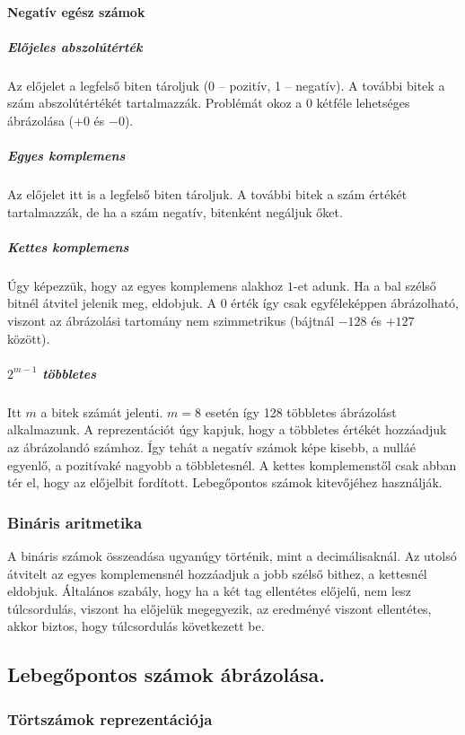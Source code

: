 \documentclass[a4paper]{article}
\begin{document}
\paragraph{Negatív egész számok}

\subparagraph{Előjeles abszolútérték} Az előjelet a legfelső biten tároljuk (0 -- pozitív, 1 -- negatív). A további bitek a szám abszolútértékét tartalmazzák. Problémát okoz a 0 kétféle lehetséges ábrázolása ($+0$ és $-0$).

\subparagraph{Egyes komplemens} Az előjelet itt is a legfelső biten tároljuk. A további bitek a szám értékét tartalmazzák, de ha a szám negatív, bitenként negáljuk őket.

\subparagraph{Kettes komplemens} Úgy képezzük, hogy az egyes komplemens alakhoz $1$-et adunk. Ha a bal szélső bitnél átvitel jelenik meg, eldobjuk. A $0$ érték így csak egyféleképpen ábrázolható, viszont az ábrázolási tartomány nem szimmetrikus (bájtnál $-128$ és $+127$ között).

\subparagraph{$2^{m-1}$ többletes} Itt $m$ a bitek számát jelenti. $m=8$ esetén így 128 többletes ábrázolást alkalmazunk. A reprezentációt úgy kapjuk, hogy a többletes értékét hozzáadjuk az ábrázolandó számhoz. Így tehát a negatív számok képe kisebb, a nulláé egyenlő, a pozitívaké nagyobb a többletesnél. A kettes komplemenstől csak abban tér el, hogy az előjelbit fordított. Lebegőpontos számok kitevőjéhez használják.

\subsubsection{Bináris aritmetika}

A bináris számok összeadása ugyanúgy történik, mint a decimálisaknál. Az utolsó átvitelt az egyes komplemensnél hozzáadjuk a jobb szélső bithez, a kettesnél eldobjuk. Általános szabály, hogy ha a két tag ellentétes előjelű, nem lesz túlcsordulás, viszont ha előjelük megegyezik, az eredményé viszont ellentétes, akkor biztos, hogy túlcsordulás következett be.

\subsection{Lebegőpontos számok ábrázolása.}

\subsubsection{Törtszámok reprezentációja}
\end{document}

